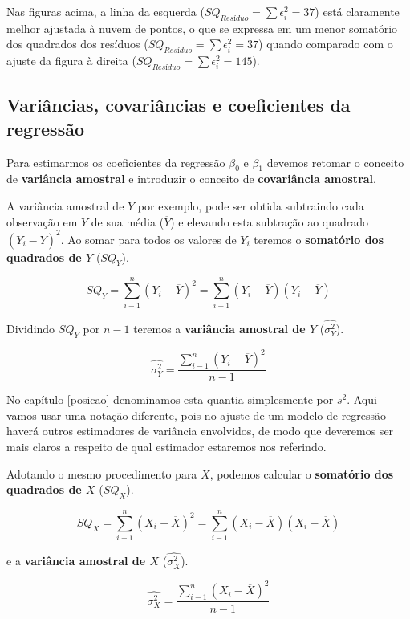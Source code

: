 \documentclass[
]{book}
\begin{document}
Nas figuras acima, a linha da esquerda (\(SQ_{Resíduo} = \sum{\epsilon_i^2} = 37\)) está claramente melhor ajustada à nuvem de pontos, o que se expressa em um menor somatório dos quadrados dos resíduos (\(SQ_{Resíduo} = \sum{\epsilon_i^2} = 37\)) quando comparado com o ajuste da figura à direita (\(SQ_{Resíduo} = \sum{\epsilon_i^2} = 145\)).

\hypertarget{variuxe2ncias-covariuxe2ncias-e-coeficientes-da-regressuxe3o}{%
\subsection{Variâncias, covariâncias e coeficientes da regressão}\label{variuxe2ncias-covariuxe2ncias-e-coeficientes-da-regressuxe3o}}

Para estimarmos os coeficientes da regressão \(\beta_0\) e \(\beta_1\) devemos retomar o conceito de \textbf{variância amostral} e introduzir o conceito de \textbf{covariância amostral}.

A variância amostral de \(Y\) por exemplo, pode ser obtida subtraindo cada observação em \(Y\) de sua média (\(\overline{Y}\)) e elevando esta subtração ao quadrado \((Y_i - \overline{Y})^2\). Ao somar para todos os valores de \(Y_i\) teremos o \textbf{somatório dos quadrados de \(Y\)} (\(SQ_Y\)).

\[SQ_Y = \sum_{i-1}^{n} (Y_i - \overline{Y})^2 = \sum_{i-1}^{n}(Y_i - \overline{Y}) (Y_i - \overline{Y})\]

Dividindo \(SQ_Y\) por \(n-1\) teremos a \textbf{variância amostral de \(Y\)} (\(\hat{\sigma^2_Y}\)).

\[\hat{\sigma^2_Y} = \frac{\sum_{i-1}^{n} (Y_i - \overline{Y})^2}{n-1}\]

No capítulo \ref{posicao} denominamos esta quantia simplesmente por \(s^2\). Aqui vamos usar uma notação diferente, pois no ajuste de um modelo de regressão haverá outros estimadores de variância envolvidos, de modo que deveremos ser mais claros a respeito de qual estimador estaremos nos referindo.

Adotando o mesmo procedimento para \(X\), podemos calcular o \textbf{somatório dos quadrados de \(X\)} (\(SQ_X\)).

\[SQ_X = \sum_{i-1}^{n} (X_i - \overline{X})^2 = \sum_{i-1}^{n}(X_i - \overline{X}) (X_i - \overline{X})\]

e a \textbf{variância amostral de \(X\)} (\(\hat{\sigma^2_X}\)).

\[\hat{\sigma^2_X} = \frac{\sum_{i-1}^{n} (X_i - \overline{X})^2}{n-1}\]
\end{document}
